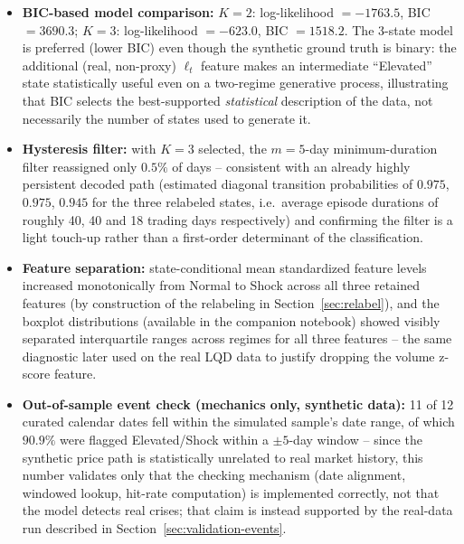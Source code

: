 \documentclass[11pt]{article}
\theoremstyle{definition}
\theoremstyle{remark}
\begin{document}
\begin{itemize}
    \item \textbf{BIC-based model comparison:} $K=2$: log-likelihood $=-1763.5$, BIC $=3690.3$; $K=3$: log-likelihood $=-623.0$, BIC $=1518.2$. The 3-state model is preferred (lower BIC) even though the synthetic ground truth is binary: the additional (real, non-proxy) $\ell_t$ feature makes an intermediate ``Elevated'' state statistically useful even on a two-regime generative process, illustrating that BIC selects the best-supported \emph{statistical} description of the data, not necessarily the number of states used to generate it.
    \item \textbf{Hysteresis filter:} with $K=3$ selected, the $m=5$-day minimum-duration filter reassigned only $0.5\%$ of days -- consistent with an already highly persistent decoded path (estimated diagonal transition probabilities of $0.975$, $0.975$, $0.945$ for the three relabeled states, i.e.\ average episode durations of roughly 40, 40 and 18 trading days respectively) and confirming the filter is a light touch-up rather than a first-order determinant of the classification.
    \item \textbf{Feature separation:} state-conditional mean standardized feature levels increased monotonically from Normal to Shock across all three retained features (by construction of the relabeling in Section~\ref{sec:relabel}), and the boxplot distributions (available in the companion notebook) showed visibly separated interquartile ranges across regimes for all three features -- the same diagnostic later used on the real LQD data to justify dropping the volume z-score feature.
    \item \textbf{Out-of-sample event check (mechanics only, synthetic data):} 11 of 12 curated calendar dates fell within the simulated sample's date range, of which $90.9\%$ were flagged Elevated/Shock within a $\pm5$-day window -- since the synthetic price path is statistically unrelated to real market history, this number validates only that the checking mechanism (date alignment, windowed lookup, hit-rate computation) is implemented correctly, not that the model detects real crises; that claim is instead supported by the real-data run described in Section~\ref{sec:validation-events}.
\end{itemize}
\end{document}
